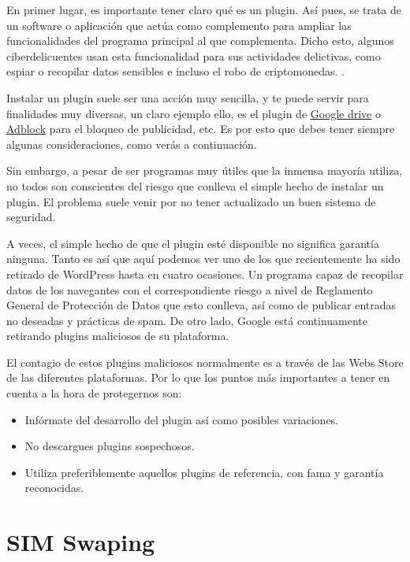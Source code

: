 \documentclass[
  spanish,
  a4paper,
  openany]{book}
\begin{document}
En primer lugar, es importante tener claro qué es un plugin. Así pues, se trata de un software o aplicación que actúa como complemento para ampliar las funcionalidades del programa principal al que complementa. Dicho esto, algunos ciberdelicuentes usan esta funcionalidad para sus actividades delictivas, como espiar o recopilar datos sensibles e incluso el robo de criptomonedas. \citep{IONOS-plugin}.

Instalar un plugin suele ser una acción muy sencilla, y te puede servir para finalidades muy diversas, un claro ejemplo ello, es el plugin de \href{https://drive.googleblog.com/2012/12/introducing-save-to-drive-extension.html}{Google drive} o \href{https://getadblock.com/}{Adblock} para el bloqueo de publicidad, etc. Es por esto que debes tener siempre algunas consideraciones, como verás a continuación.

Sin embargo, a pesar de ser programas muy útiles que la inmensa mayoría utiliza, no todos son conscientes del riesgo que conlleva el simple hecho de instalar un plugin. El problema suele venir por no tener actualizado un buen sistema de seguridad.

A veces, el simple hecho de que el plugin esté disponible no significa garantía ninguna. Tanto es así que aquí podemos ver uno de los que recientemente ha sido retirado de WordPress hasta en cuatro ocasiones. Un programa capaz de recopilar datos de los navegantes con el correspondiente riesgo a nivel de Reglamento General de Protección de Datos que esto conlleva, así como de publicar entradas no deseadas y prácticas de spam. De otro lado, Google está continuamente retirando plugins maliciosos de su plataforma.

El contagio de estos plugins maliciosos normalmente es a través de las Webs Store de las diferentes plataformas. Por lo que los puntos más importantes a tener en cuenta a la hora de protegernos son:

\begin{itemize}
\item
  Infórmate del desarrollo del plugin así como posibles variaciones.
\item
  No descargues plugins sospechosos.
\item
  Utiliza preferiblemente aquellos plugins de referencia, con fama y garantía reconocidas.
\end{itemize}

\hypertarget{sim-swaping}{%
\section{SIM Swaping}\label{sim-swaping}}
\end{document}
